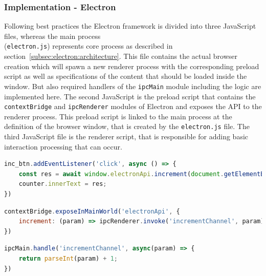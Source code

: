 \subsubsection{Implementation - Electron}
\label{subsubsec:impl:electron}
Following best practices the Electron framework is divided into three JavaScript files, whereas the main process \\(\texttt{electron.js}) represents core process as described in section~\ref{subsec:electron:architecture}.
This file contains the actual browser creation which will spawn a new renderer process  with the corresponding preload script as well as specifications of the content that should be loaded inside the window.
But also required handlers of the \texttt{ipcMain} module including the logic are implemented here.
The second JavaScript is the preload script that contains the \texttt{contextBridge}  and \texttt{ipcRenderer} modules of Electron and exposes the API to the renderer process.
This preload script is linked to the main process at the definition of the browser window, that is created by the \texttt{electron.js} file.
The third JavaScript file is the renderer script, that is responsible for adding basic interaction processing that can occur.

\begin{lstlisting}[language=JavaScript,label={lst:rendererjs}, caption={Excerpt of render.js}]
inc_btn.addEventListener('click', async () => {
    const res = await window.electronApi.increment(document.getElementById('counter').innerText)
    counter.innerText = res;
})
\end{lstlisting}
\begin{lstlisting}[language=JavaScript,label={lst:preloadjs}, caption={Excerpt of preload.js}]
contextBridge.exposeInMainWorld('electronApi', {
    increment: (param) => ipcRenderer.invoke('incrementChannel', param),
})
\end{lstlisting}
\begin{lstlisting}[language=JavaScript,label={lst:electronjs}, caption={Excerpt of electron.js}]
ipcMain.handle('incrementChannel', async(param) => {
    return parseInt(param) + 1;
})
\end{lstlisting}

